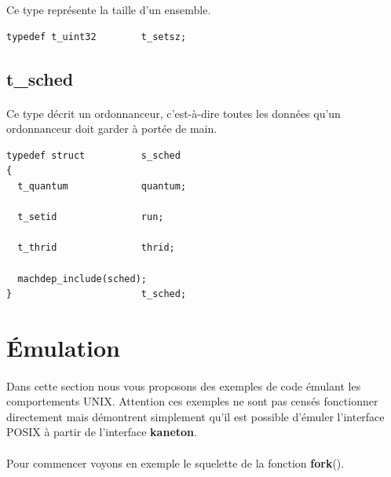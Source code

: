 \documentclass[10pt,a4wide]{article}
\begin{document}
Ce type repr\'esente la taille d'un ensemble.

\begin{verbatim}
typedef t_uint32        t_setsz;
\end{verbatim}

\subsection{t\_sched}

\paragraph{}

Ce type d\'ecrit un ordonnanceur, c'est-\`a-dire toutes les donn\'ees
qu'un ordonnanceur doit garder \`a port\'ee de main.

\begin{verbatim}
typedef struct          s_sched
{
  t_quantum             quantum;

  t_setid               run;

  t_thrid               thrid;

  machdep_include(sched);
}                       t_sched;
\end{verbatim}

\section{\'Emulation}

\paragraph{}

Dans cette section nous vous proposons des exemples de code \'emulant
les comportements UNIX. Attention ces exemples ne sont pas cens\'es fonctionner
directement mais d\'emontrent simplement qu'il est possible d'\'emuler
l'interface POSIX \`a partir de l'interface \textbf{kaneton}.

\paragraph{}

Pour commencer voyons en exemple le squelette de la fonction \textbf{fork}().
\end{document}
